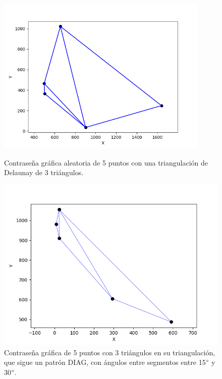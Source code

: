 \documentclass[12pt]{report}
\begin{document}
	\begin{figure}[h]
	\centering
	\begin{minipage}[t]{0.45\textwidth}
		\centering
	\includegraphics[width=0.9\textwidth]{alea3td.png}
	\caption{Contraseña gráfica aleatoria de 5 puntos con una triangulación de Delaunay de 3 triángulos.}
	\label{3TD}
		
	\end{minipage}\hfill
	\begin{minipage}[t]{0.45\textwidth}
		\centering
		\includegraphics[width=0.9\linewidth]{3td30.png}  %
		\caption{Contraseña gráfica de 5 puntos con 3 triángulos en su triangulación, que sigue un patrón DIAG, con ángulos entre segmentos entre 15$\degree$ y 30$\degree$.}
		\label{3td30}
	\end{minipage}
\end{figure}
\end{document}
